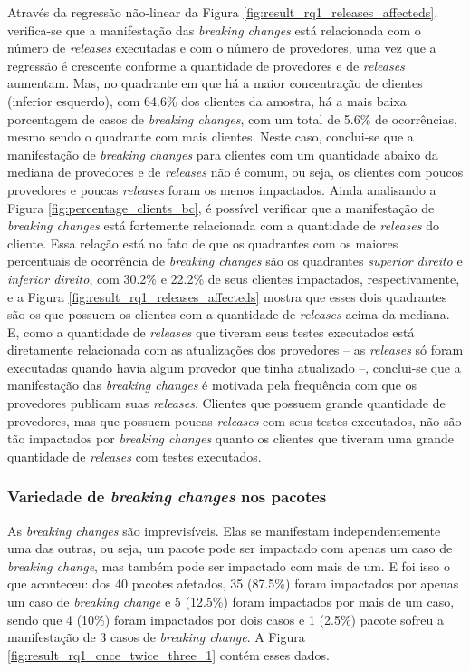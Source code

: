 Através da regressão não-linear da Figura \ref{fig:result_rq1_releases_affecteds}, verifica-se que a manifestação das \textit{breaking changes} está relacionada com o número de \textit{releases} executadas e com o número de provedores, uma vez que a regressão é crescente conforme a quantidade de provedores e de \textit{releases} aumentam. Mas, no quadrante em que há a maior concentração de clientes (inferior esquerdo), com 64.6\% dos clientes da amostra, há a mais baixa porcentagem de casos de \textit{breaking changes}, com um total de 5.6\% de ocorrências, mesmo sendo o quadrante com mais clientes. Neste caso, conclui-se que a manifestação de \textit{breaking changes} para clientes com um quantidade abaixo da mediana de provedores e de \textit{releases} não é comum, ou seja, os clientes com poucos provedores e poucas \textit{releases} foram os menos impactados. Ainda analisando a Figura \ref{fig:percentage_clients_bc}, é possível verificar que a manifestação de \textit{breaking changes} está fortemente relacionada com a quantidade de \textit{releases} do cliente. Essa relação está no fato de que os quadrantes com os maiores percentuais de ocorrência de \textit{breaking changes} são os quadrantes \textit{superior direito} e \textit{inferior direito}, com 30.2\% e 22.2\% de seus clientes impactados, respectivamente, e a Figura \ref{fig:result_rq1_releases_affecteds} mostra que esses dois quadrantes são os que possuem os clientes com a quantidade de \textit{releases} acima da mediana. E, como a quantidade de \textit{releases} que tiveram seus testes executados está diretamente relacionada com as atualizações dos provedores -- as \textit{releases} só foram executadas quando havia algum provedor que tinha atualizado --, conclui-se que a manifestação das \textit{breaking changes} é motivada pela frequência com que os provedores publicam suas \textit{releases}. Clientes que possuem grande quantidade de provedores, mas que possuem poucas \textit{releases} com seus testes executados, não são tão impactados por \textit{breaking changes} quanto os clientes que tiveram uma grande quantidade de \textit{releases} com testes executados.

\subsubsection{Variedade de \textit{breaking changes} nos pacotes}
As \textit{breaking changes} são imprevisíveis. Elas se manifestam independentemente uma das outras, ou seja, um pacote pode ser impactado com apenas um caso de \textit{breaking change}, mas também pode ser impactado com mais de um. E foi isso o que aconteceu: dos 40 pacotes afetados, 35 (87.5\%) foram impactados por apenas um caso de \textit{breaking change} e 5 (12.5\%) foram impactados por mais de um caso, sendo que 4 (10\%) foram impactados por dois casos e 1 (2.5\%) pacote sofreu a manifestação de 3 casos de \textit{breaking change}. A Figura \ref{fig:result_rq1_once_twice_three_1} contém esses dados.

